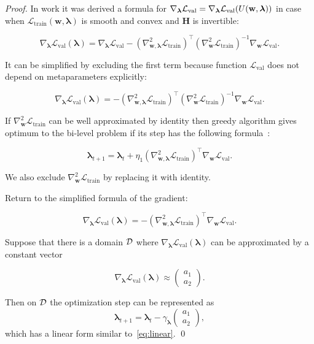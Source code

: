 \documentclass[runningheads]{llncs}
\begin{document}
\begin{proof} 
In work \cite{journals/corr/Pedregosa16} it was derived a formula for $\nabla_{\boldsymbol{\lambda}}\mathcal{L}_\text{val} = \nabla_{\boldsymbol{\lambda}}\mathcal{L}_\text{val}(U(\mathbf{w}, \boldsymbol{\lambda}))$ in case when $\mathcal{L}_\text{train}(\textbf{w}, \boldsymbol{\lambda})$  is smooth and convex and $\mathbf{H}$ is invertible:

$$
    \nabla_{\boldsymbol{\lambda}}\mathcal{L}_\text{val}(\boldsymbol{\lambda}) = \nabla_{\boldsymbol{\lambda}}\mathcal{L}_\text{val} - (\nabla_{\textbf{w}, \boldsymbol{\lambda}}^2\mathcal{L}_\text{train})^\top(\nabla_{\textbf{w}}^2\mathcal{L}_\text{train})^{-1}\nabla_{\textbf{w}}\mathcal{L}_\text{val}.
$$

It can be simplified by excluding the first term because function $\mathcal{L}_\text{val}$ does not depend on metaparameters explicitly:

$$
    \nabla_{\boldsymbol{\lambda}}\mathcal{L}_\text{val}(\boldsymbol{\lambda}) = - (\nabla_{\textbf{w}, \boldsymbol{\lambda}}^2\mathcal{L}_\text{train})^\top(\nabla_{\textbf{w}}^2\mathcal{L}_\text{train})^{-1}\nabla_{\textbf{w}}\mathcal{L}_\text{val}.
$$

If $\nabla_{\textbf{w}}^2 \mathcal{L}_\text{train}$ can be well approximated by identity then greedy algorithm gives optimum to the bi-level problem if its step has the following formula~\cite{journals/corr/LuketinaBR15}:

$$
    \boldsymbol{\lambda}_{t+1} = \boldsymbol{\lambda}_{t} + \eta_1(\nabla_{\textbf{w}, \boldsymbol{\lambda}}^2\mathcal{L}_\text{train})^\top\nabla_{\textbf{w}}\mathcal{L}_\text{val}.
$$

We also exclude $\nabla_{\textbf{w}}^2 \mathcal{L}_\text{train}$  by replacing it with identity.

Return to the simplified formula of the gradient:

$$\nabla_{\boldsymbol{\lambda}}\mathcal{L}_\text{val}(\boldsymbol{\lambda}) = - (\nabla_{\textbf{w}, \boldsymbol{\lambda}}^2\mathcal{L}_\text{train})^\top\nabla_{\textbf{w}}\mathcal{L}_\text{val}.$$

Suppose that there is a domain $\mathcal{D}$ where $\nabla_{\boldsymbol{\lambda}}\mathcal{L}_\text{val}(\boldsymbol{\lambda})$ can be approximated by a constant vector

\[\nabla_{\boldsymbol{\lambda}}\mathcal{L}_\text{val}(\boldsymbol{\lambda}) \approx \begin{pmatrix} a_1\\ a_2\end{pmatrix}.\]

Then on $\mathcal{D}$ the optimization  step can be represented as
$$
    \boldsymbol{\lambda}_{t+1} = \boldsymbol{\lambda}_{t} - \gamma_{\boldsymbol{\lambda}}\begin{pmatrix} a_1\\ a_2\end{pmatrix},
$$
\noindent
which has a linear form similar to~\eqref{eq:linear}. \qed
\end{proof}
\end{document}
